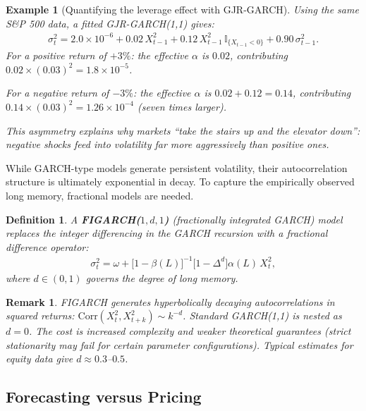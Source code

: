 \documentclass{report}
\theoremstyle{spacedplain}
\theoremstyle{spaceddefinition}
\newtheorem{definition}[theorem]{Definition}
\newtheorem{example}[theorem]{Example}
\theoremstyle{spacedremark}
\newtheorem{remark}[theorem]{Remark}
\begin{document}
\begin{example}[Quantifying the leverage effect with GJR-GARCH]
Using the same S\&P 500 data, a fitted GJR-GARCH(1,1) gives:
\begin{align}
    \sigma_t^2 = 2.0 \times 10^{-6} + 0.02\, X_{t-1}^2 + 0.12\, X_{t-1}^2\, \mathbb{I}_{\{X_{t-1} < 0\}} + 0.90\, \sigma_{t-1}^2.
\end{align}
For a positive return of $+3\%$: the effective $\alpha$ is $0.02$, contributing $0.02 \times (0.03)^2 = 1.8 \times 10^{-5}$.

For a negative return of $-3\%$: the effective $\alpha$ is $0.02 + 0.12 = 0.14$, contributing $0.14 \times (0.03)^2 = 1.26 \times 10^{-4}$ (seven times larger).

This asymmetry explains why markets ``take the stairs up and the elevator down'': negative shocks feed into volatility far more aggressively than positive ones.
\end{example}

While GARCH-type models generate persistent volatility, their autocorrelation structure is ultimately exponential in decay. To capture the empirically observed long memory, fractional models are needed.

\begin{definition}
A \textbf{FIGARCH($1,d,1$)} (fractionally integrated GARCH) model replaces the integer differencing in the GARCH recursion with a fractional difference operator:
\begin{align}
    \sigma_t^2 = \omega + \bigl[1 - \beta(L)\bigr]^{-1}\bigl[1 - \Delta^d\bigr]\alpha(L)\, X_t^2,
\end{align}
where $d \in (0,1)$ governs the degree of long memory.
\end{definition}

\begin{remark}
FIGARCH generates hyperbolically decaying autocorrelations in squared returns: $\text{Corr}(X_t^2, X_{t+k}^2) \sim k^{-d}$. Standard GARCH(1,1) is nested as $d = 0$. The cost is increased complexity and weaker theoretical guarantees (strict stationarity may fail for certain parameter configurations). Typical estimates for equity data give $d \approx 0.3$--$0.5$.
\end{remark}


\subsection{Forecasting versus Pricing}
\end{document}
